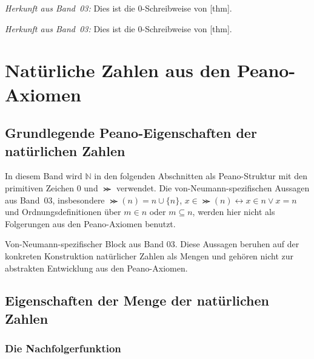 \documentclass[main.tex]{subfiles}
\begin{document}
\par\noindent\emph{Herkunft aus Band~03:} Dies ist die \(0\)-Schreibweise von
[thm].\par

\par\noindent\emph{Herkunft aus Band~03:} Dies ist die \(0\)-Schreibweise von
[thm].\par

\chapter{Natürliche Zahlen aus den Peano-Axiomen}

\section{Grundlegende Peano-Eigenschaften der natürlichen Zahlen}

In diesem Band wird \(\mathbb{N}\) in den folgenden Abschnitten als
Peano-Struktur mit den primitiven Zeichen \(0\) und \(\Succ\) verwendet. Die
von-Neumann-spezifischen Aussagen aus Band~03, insbesondere
\(\Succ(n)=n\cup\{n\}\), \(x\in\Succ(n)\leftrightarrow x\in n\lor x=n\) und
Ordnungsdefinitionen über \(m\in n\) oder \(m\subseteq n\), werden hier nicht
als Folgerungen aus den Peano-Axiomen benutzt.

\iffalse
Von-Neumann-spezifischer Block aus Band 03. Diese Aussagen beruhen auf der
konkreten Konstruktion natürlicher Zahlen als Mengen und gehören nicht zur
abstrakten Entwicklung aus den Peano-Axiomen.
\section{Eigenschaften der Menge der natürlichen Zahlen}

\subsection{Die Nachfolgerfunktion}
\end{document}
